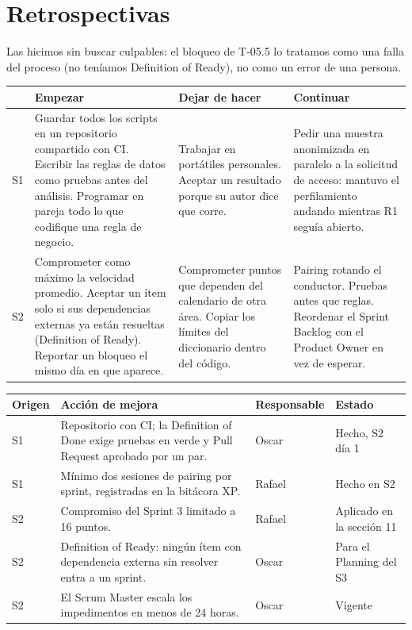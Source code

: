 \documentclass[10pt,a4paper]{article}
\begin{document}
\section{Retrospectivas}
Las hicimos sin buscar culpables: el bloqueo de T-05.5 lo tratamos como una falla del proceso (no teníamos
Definition of Ready), no como un error de una persona.

{\footnotesize
\begin{tabularx}{\linewidth}{@{}l L L L@{}}
\toprule
 & Empezar & Dejar de hacer & Continuar \\
\midrule
S1 & Guardar todos los scripts en un repositorio compartido con CI. Escribir las reglas de datos como pruebas antes del análisis. Programar en pareja todo lo que codifique una regla de negocio. &
Trabajar en portátiles personales. Aceptar un resultado porque su autor dice que corre. &
Pedir una muestra anonimizada en paralelo a la solicitud de acceso: mantuvo el perfilamiento andando mientras R1 seguía abierto. \\
S2 & Comprometer como máximo la velocidad promedio. Aceptar un ítem solo si sus dependencias externas ya están resueltas (Definition of Ready). Reportar un bloqueo el mismo día en que aparece. &
Comprometer puntos que dependen del calendario de otra área. Copiar los límites del diccionario dentro del código. &
Pairing rotando el conductor. Pruebas antes que reglas. Reordenar el Sprint Backlog con el Product Owner en vez de esperar. \\
\bottomrule
\end{tabularx}

\vspace{4pt}
\begin{tabularx}{\linewidth}{@{}l L l l@{}}
\toprule
Origen & Acción de mejora & Responsable & Estado \\
\midrule
S1 & Repositorio con CI; la Definition of Done exige pruebas en verde y Pull Request aprobado por un par. & Oscar & Hecho, S2 día 1 \\
S1 & Mínimo dos sesiones de pairing por sprint, registradas en la bitácora XP. & Rafael & Hecho en S2 \\
S2 & Compromiso del Sprint 3 limitado a 16 puntos. & Rafael & Aplicado en la sección 11 \\
S2 & Definition of Ready: ningún ítem con dependencia externa sin resolver entra a un sprint. & Oscar & Para el Planning del S3 \\
S2 & El Scrum Master escala los impedimentos en menos de 24 horas. & Oscar & Vigente \\
\bottomrule
\end{tabularx}}
\end{document}
